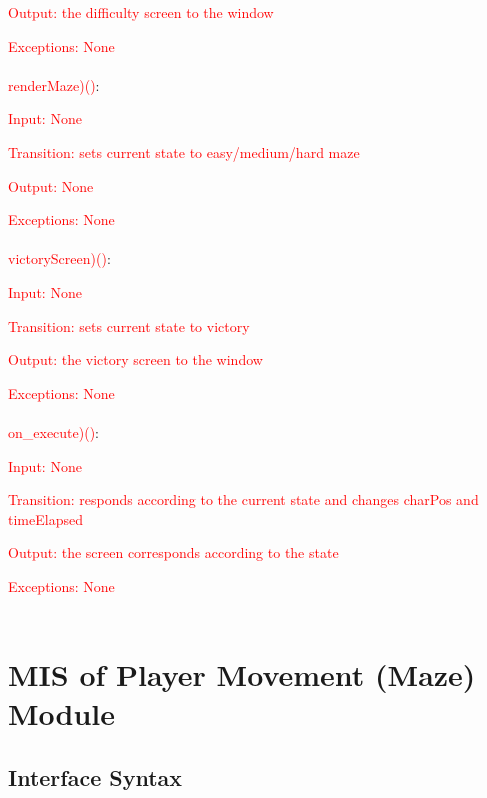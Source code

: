 \documentclass[12pt, titlepage]{article}
\begin{document}
		\textcolor{red}{Output: the difficulty screen to the window}
		
		\textcolor{red}{Exceptions: None}\\
        \\
        \textcolor{red}{renderMaze)()}:
		
		\textcolor{red}{Input: None}
		
		\textcolor{red}{Transition: sets current state to easy/medium/hard maze}
		
		\textcolor{red}{Output: None}
		
		\textcolor{red}{Exceptions: None}\\
        \\
        \textcolor{red}{victoryScreen)()}:
		
		\textcolor{red}{Input: None}
		
		\textcolor{red}{Transition: sets current state to victory}
		
		\textcolor{red}{Output: the victory screen to the window}
		
		\textcolor{red}{Exceptions: None}\\
        \\
        \textcolor{red}{on\_execute)()}:
		
		\textcolor{red}{Input: None}
		
		\textcolor{red}{Transition: responds according to the current state and changes charPos and timeElapsed}
		
		\textcolor{red}{Output: the screen corresponds according to the state}
		
		\textcolor{red}{Exceptions: None}\\
        \\
		
\section{MIS of Player Movement (Maze) Module}
		\subsection{Interface Syntax}
\end{document}
